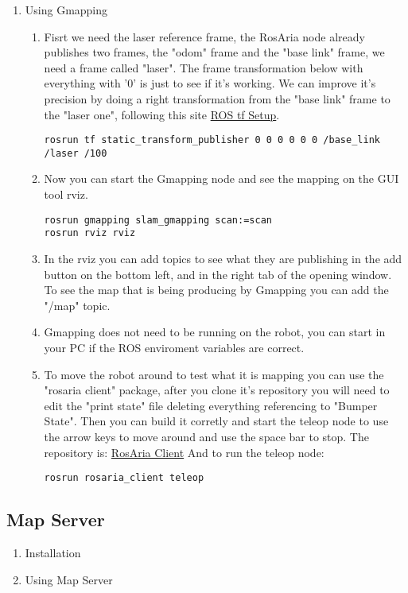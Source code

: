 \documentclass{article}
\begin{document}
\begin{enumerate}
\item Using Gmapping
\begin{enumerate}
\item Fisrt we need the laser reference frame, the RosAria node already publishes
two frames, the "odom" frame and the "base link" frame, we need a frame called
"laser". The frame transformation below with everything with '0' is just to see
if it's working. We can improve it's precision by doing a right transformation
from the "base link" frame to the "laser one", following this site \href{http://wiki.ros.org/navigation/Tutorials/RobotSetup/TF}{ROS tf Setup}.
\begin{lstlisting}
rosrun tf static_transform_publisher 0 0 0 0 0 0 /base_link /laser /100
\end{lstlisting}
\item Now you can start the Gmapping node and see the mapping on the GUI tool
rviz.
\begin{lstlisting}
rosrun gmapping slam_gmapping scan:=scan
rosrun rviz rviz
\end{lstlisting}
\item In the rviz you can add topics to see what they are publishing in the add
button on the bottom left, and in the right tab of the opening window. To see the
map that is being producing by Gmapping you can add the "/map" topic.
\item Gmapping does not need to be running on the robot, you can start in your PC
if the ROS enviroment variables are correct.
\item To move the robot around to test what it is mapping you can use the
"rosaria client" package, after you clone it's repository you will need to edit
the "print state" file deleting everything referencing to "Bumper State". Then
you can build it corretly and start the teleop node to use the arrow keys to move
around and use the space bar to stop. The repository is: \href{https://github.com/pengtang/rosaria_client}{RosAria Client}
And to run the teleop node:
\begin{lstlisting}
rosrun rosaria_client teleop
\end{lstlisting}
\end{enumerate}
\end{enumerate}

\subsection{Map Server}
\begin{enumerate}

\item Installation
\begin{enumerate}
\end{enumerate}

\item Using Map Server
\begin{enumerate}
\end{enumerate}
\end{enumerate}
\end{document}
